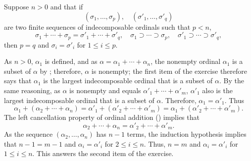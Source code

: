 \documentclass{article}
\begin{document}
\begin{solution}[\ref{exe:fdb94svq}]
  Suppose \(n > 0\) and that if
  \begin{displaymath}
    (\sigma_1, \dotsc, \sigma_p),
    \quad
    (\sigma'_1, \dotsc, \sigma'_q)
  \end{displaymath}
  are two finite sequences of indecomposable ordinals such that
  \(p < n\),
  \begin{displaymath}
    \sigma_1 + \dotsb + \sigma_p = \sigma'_1 + \dotsb + \sigma'_q,
    \quad
    \sigma_1 \supset \dotsb \supset \sigma_p,
    \quad
    \sigma'_1 \supset \dotsb \supset \sigma'_q,
  \end{displaymath}
  then \(p = q\) and \(\sigma_i = \sigma'_i\) for \(1 \leq i \leq p\).
  
  As \(n > 0\), \(\alpha_1\) is defined, and as
  \(\alpha = \alpha_1 + \dotsb + \alpha_n\), the nonempty ordinal
  \(\alpha_1\) is a subset of \(\alpha\) by ;
  therefore, \(\alpha\) is nonempty; the first item of the exercise
  therefore says that \(\alpha_1\) is the largest indecomposable
  ordinal that is a subset of \(\alpha\).  By the same reasoning, as
  \(\alpha\) is nonempty and equals
  \(\alpha'_1 + \dotsb + \alpha'_m\), \(\alpha'_1\) also is the
  largest indecomposable ordinal that is a subset of \(\alpha\).
  Therefore, \(\alpha_1 = \alpha'_1\).  Thus
  \begin{displaymath}
    \alpha_1 + (\alpha_2 + \dotsb + \alpha_n) =
    \alpha'_1 + (\alpha'_2 + \dotsb + \alpha'_m) =
    \alpha_1 + (\alpha'_2 + \dotsb + \alpha'_m).
  \end{displaymath}
  The left cancellation property of ordinal addition
  () implies that
  \begin{displaymath}
    \alpha_2 + \dotsb + \alpha_n =
    \alpha'_2 + \dotsb + \alpha'_m.
  \end{displaymath}
  As the sequence \((\alpha_2, \dotsc, \alpha_n)\) has \(n-1\) terms,
  the induction hypothesis implies that \(n-1 = m-1\) and
  \(\alpha_i = \alpha'_i\) for \(2 \leq i \leq n\).  Thus, \(n = m\)
  and \(\alpha_i = \alpha'_i\) for \(1 \leq i \leq n\).  This answers
  the second item of the exercise.


\end{solution}
\end{document}
